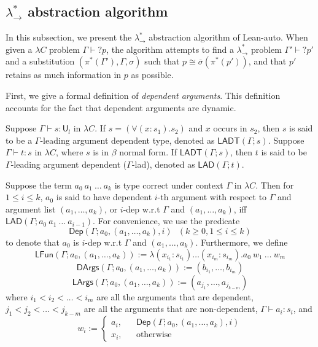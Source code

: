 \subsection{$\lambda_\to^*$ abstraction algorithm}\label{labstalgo}

In this subsection, we present the $\lambda_\to^*$ abstraction algorithm of Lean-auto. When given a
$\lambda C$ problem $\Gamma \vdash? p$, the algorithm attempts to find a $\lambda_\to^*$
problem $\Gamma' \vdash? p'$ and a substitution $(\pi^*(\Gamma'), \Gamma, \sigma)$ such that
$p \cong \overline{\sigma}(\pi^*(p'))$, and that $p'$ retains as much information in $p$ as possible.

First, we give a formal definition of \textit{dependent arguments}. This definition accounts for
the fact that dependent arguments are dynamic.

\begin{definition} Suppose $\Gamma \vdash s : \mathsf{U}_l$ in $\lambda C$.
  If $s = (\forall (x : s_1). s_2)$ and $x$ occurs in $s_2$,
  then $s$ is said to be a $\Gamma$-leading argument dependent type,
  denoted as $\mathsf{LADT}(\Gamma; s)$. Suppose $\Gamma \vdash t : s$ in $\lambda C$, where $s$
  is in $\beta$ normal form. If $\mathsf{LADT}(\Gamma; s)$, then $t$ is said to be
  $\Gamma$-leading argument dependent ($\Gamma$-lad), denoted as $\mathsf{LAD}(\Gamma; t)$.
\end{definition}

\begin{definition} Suppose the term $a_0 \ a_1 \ \dots \ a_k$ is type correct under
  context $\Gamma$ in $\lambda C$. Then for $1 \leq i \leq k$, $a_0$ is said to have dependent $i$-th argument
  with respect to $\Gamma$ and argument list $(a_1, \dots, a_k)$, or $i$-dep w.r.t
  $\Gamma$ and $(a_1, \dots, a_k)$, iff $\mathsf{LAD}(\Gamma; a_0 \ a_1 \ \dots \ a_{i - 1})$.
  For convenience, we use the predicate
  $$\mathsf{Dep}(\Gamma; a_0, (a_1, \dots, a_k), i) \ \ \ (k \geq 0, 1 \leq i \leq k)$$
  to denote that $a_0$ is $i$-dep w.r.t $\Gamma$ and $(a_1, \dots, a_k)$. Furthermore, we define
  $$\mathsf{LFun}(\Gamma; a_0, (a_1, \dots, a_k)) := \lambda (x_{i_1} : s_{i_1}) \dots (x_{i_m} : s_{i_m}). a_0 \ w_1 \ \dots \ w_m$$
  $$\mathsf{DArgs}(\Gamma; a_0, (a_1, \dots, a_k)) := (b_{i_1}, \dots, b_{i_m})$$
  $$\mathsf{LArgs}(\Gamma; a_0, (a_1, \dots, a_k)) := (a_{j_1}, \dots, a_{j_{k - m}})$$
  where $i_1 < i_2 < \dots < i_m$ are all the arguments that are dependent, $j_1 < j_2 < \dots < j_{k - m}$
  are all the arguments that are non-dependent, $\Gamma \vdash a_i : s_i$, and
  $$w_i := \left\{\begin{aligned}
    a_i, & & \mathsf{Dep}(\Gamma; a_0, (a_1, \dots, a_k), i) \\
    x_i, & & \text{otherwise}
  \end{aligned}\right.$$
\end{definition}

